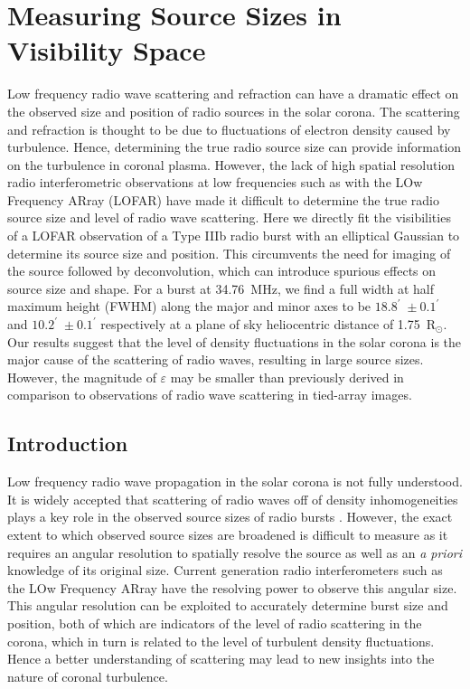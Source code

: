\doublespacing
\chapter{Measuring Source Sizes in Visibility Space}
\label{chap:measuring_source_sizes}

Low frequency radio wave scattering and refraction can have a dramatic effect on the observed size and position of radio sources in the solar corona.
The scattering and refraction is thought to be due to fluctuations of electron density caused by turbulence. Hence, determining the true radio source size can provide information on the turbulence in coronal plasma.
However, the lack of high spatial resolution radio interferometric observations at low frequencies such as with the LOw Frequency ARray (LOFAR) have made it difficult to determine the true radio source size and level of radio wave scattering.
Here we directly fit the visibilities of a LOFAR observation of a Type IIIb radio burst with an elliptical Gaussian to determine its source size and position. This circumvents the need for imaging of the source followed by deconvolution, which can introduce spurious effects on source size and shape.
For a burst at 34.76~MHz, we find a full width at half maximum height (FWHM) along the major and minor axes to be $18.8^\prime$~$\pm~0.1^\prime$ and $10.2^\prime$~$\pm~0.1^\prime$ respectively at a plane of sky heliocentric distance of 1.75~R$_\odot$.
Our results suggest that the level of density fluctuations in the solar corona  is  the  major  cause  of  the  scattering  of  radio  waves, resulting in  large  source  sizes. However, the magnitude of $\varepsilon$ may be smaller than previously derived in comparison to observations of radio wave scattering in tied-array images.

\section{Introduction} \label{sec:intro}
Low frequency radio wave propagation in the solar corona is not fully understood. It is widely accepted that scattering of radio waves off of density inhomogeneities plays a key role in the observed source sizes of radio bursts \citep{Fokker1965,Steinberg1971,Stewart1972,Riddle1974,Thejappa2007,Thejappa2008,Kontar2019}. However, the exact extent to which observed source sizes are broadened is difficult to measure as it requires an angular resolution to spatially resolve the source as well as an \textit{a priori} knowledge of its original size.
Current generation radio interferometers such as the LOw Frequency ARray \citep[LOFAR;][]{VanHaarlem2013b} have the resolving power to observe this angular size. This angular resolution can be exploited to accurately determine burst size and position, both of which are indicators of the level of radio scattering in the corona, which in turn is related to the level of turbulent density fluctuations. Hence a better understanding of scattering may lead to new insights into the nature of coronal turbulence.


